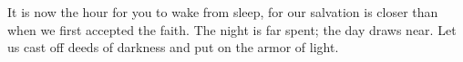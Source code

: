 
\lettrine{I}{}t is now the hour for you to wake from sleep, for our salvation is closer than when we first accepted the faith. The night is far spent; the day draws near. Let us cast off deeds of darkness and put on the armor of light.